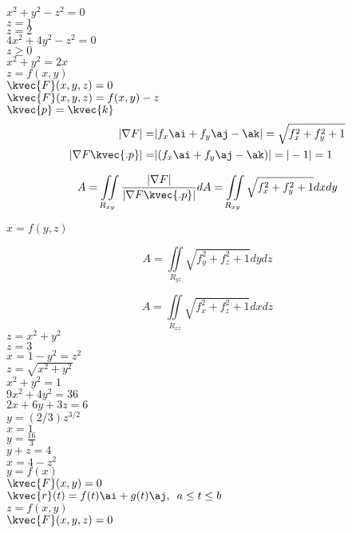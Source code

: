 \(x^2+y^2-z^2=0\)  \\
\(z=1\)  \\
\(z=2\)   \\
\(4x^2+4y^2-z^2=0\)  \\
\(z\ge 0\)  \\
\(x^2+y^2=2x\) \\

\(z=f(x,y)\)  \\
\(\kvec{F}(x,y,z)=0\)  \\
\(\kvec{F}(x,y,z)=f(x,y)-z\)  \\
\(\kvec{p}=\kvec{k}\)   \\
\begin{align*}
|\nabla F|=&|f_{x}\ai+f_{y}\aj-\ak|= \sqrt{f_{x}^2+f_{y}^2+1}\\
|\nabla F\kvec{.p}|=&|(f_{x}\ai+f_{y}\aj-\ak)|=|-1|=1
\end{align*}

\begin{equation}
A=\iint\limits_{R_{xy}}\frac{|\nabla F|}{|\nabla F\kvec{.p}|}dA=\iint\limits_{R_{xy}}\sqrt{f_{x}^2+f_{y}^2+1}dxdy
\end{equation}

\(x=f(y,z)\)

\begin{equation}
A=\iint\limits_{R_{yz}}\sqrt{f_{y}^2+f_{z}^2+1}dydz
\end{equation}

\begin{equation}
A=\iint\limits_{R_{xz}}\sqrt{f_{x}^2+f_{z}^2+1}dxdz
\end{equation}
\(z=x^2+y^2\)  \\
\(z=3\)  \\
\(x=1-y^2=z^2\) \\
\(z=\sqrt{x^2+y^2}\)  \\
\(x^2+y^2=1\)   \\
\(9x^2+4y^2=36\)  \\
\(2x+6y+3z=6\) \\
\(y=(2/3)z^{3/2}\) \\
\(x=1\) \\
\(y=\frac{16}{3}\) \\
\(y+z=4\) \\
\(x=4-z^2\) \\

\(y=f(x)\)  \\
\(\kvec{F}(x,y)=0\)  \\
\(\kvec{r}(t)=f(t)\ai+g(t)\aj,\,\,\,a\le t\le b\)  \\
\(z=f(x,y)\) \\
\(\kvec{F}(x,y,z)=0\)\\

